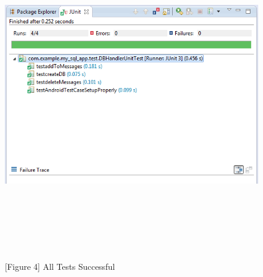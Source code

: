 \documentclass[29pt,a4paper]{moderncv}
\begin{document}
	\begin{figure}
				\centering
				\\ \includegraphics[width=6.0in, height=5.0in]{./success.png}
				\\ \\ \caption{[Figure 4] All Tests Successful}
	\end{figure}\\
	
\end{document}
